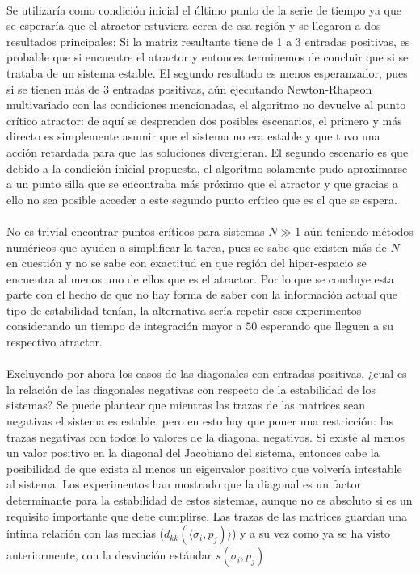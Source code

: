 \documentclass[a4paper,11pt]{book}
\theoremstyle{plain}
\theoremstyle{definition}
\begin{document}
\\
Se utilizaría como condición inicial el último punto de la serie de tiempo ya que se esperaría que el atractor estuviera cerca de esa región y se llegaron a dos resultados principales: Si la matriz resultante tiene de 1 a 3 entradas positivas, es probable que si encuentre el atractor y entonces terminemos de concluir que si se trataba de un sistema estable. El segundo resultado es menos esperanzador, pues si se tienen más de 3 entradas positivas, aún ejecutando Newton-Rhapson multivariado con las condiciones mencionadas, el algoritmo no devuelve al punto crítico atractor: de aquí se desprenden dos posibles escenarios, el primero y más directo es simplemente asumir que el sistema no era estable y que tuvo una acción retardada para que las soluciones divergieran. El segundo escenario es que debido a la condición inicial propuesta, el algoritmo solamente pudo aproximarse a un punto silla que se encontraba más próximo que el atractor y que gracias a ello no sea posible acceder a este segundo punto crítico que es el que se espera.\\
\\
No es trivial encontrar puntos críticos para sistemas $N\gg1$ aún teniendo métodos numéricos que ayuden a simplificar la tarea, pues se sabe que existen más de $N$ en cuestión y no se sabe con exactitud en que región del hiper-espacio se encuentra al menos uno de ellos que es el atractor. Por lo que se concluye esta parte con el hecho de que no hay forma de saber con la información actual que tipo de estabilidad tenían, la alternativa sería repetir esos experimentos considerando un tiempo de integración mayor a $50$ esperando que lleguen a su respectivo atractor.\\
\\
Excluyendo por ahora los casos de las diagonales con entradas positivas, ¿cual es la relación de las diagonales negativas con respecto de la estabilidad de los sistemas? Se puede plantear que mientras las trazas de las matrices sean negativas el sistema es estable, pero en esto hay que poner una restricción: las trazas negativas con todos lo valores de la diagonal negativos. Si existe al menos un valor positivo en la diagonal del Jacobiano del sistema, entonces cabe la posibilidad de que exista al menos un eigenvalor positivo que volvería intestable al sistema. Los experimentos han mostrado que la diagonal es un factor determinante para la estabilidad de estos sistemas, aunque no es absoluto si es un requisito importante que debe cumplirse. Las trazas de las matrices guardan una íntima relación con las medias ($d_{kk}(\langle \sigma_i,p_j)\rangle$) y a su vez como ya se ha visto anteriormente, con la desviación estándar $s(\sigma_i,p_j)$
\end{document}
